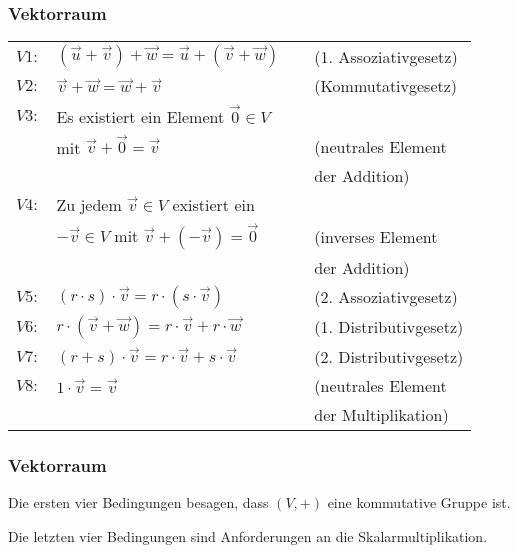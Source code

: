 \documentclass[hyperref={pdfpagelabels=false}]{beamer}
\theoremstyle{plain}%
\theoremstyle{definition}
\theoremstyle{remark}
\newcommand{\vektor}[1]{\overrightarrow{#1}}
\begin{document}
\begin{frame}
\frametitle{Vektorraum}

\begin{definition}
\begin{tabular} {l l c l}
$V1:$ & $\left(\vektor{u} + \vektor{v} \right) + \vektor{w} = 
\vektor{u} + \left(\vektor{v} + \vektor{w} \right)$ & $\,$ &
(1. Assoziativgesetz) \\
$V2:$ & $\vektor{v} + \vektor{w} = \vektor{w} + 
\vektor{v}$ & & (Kommutativgesetz) \\
$V3:$ & Es existiert ein Element $\vektor{0} \in V$ & & \\
& mit  $\vektor{v} + \vektor{0} = \vektor{v}$ & & (neutrales 
Element \\
& & & der Addition) \\
$V4:$ & Zu jedem $\vektor{v} \in V$ existiert ein  
& & \\
& $-\vektor{v} \in V$ mit $\vektor{v} + (- \vektor{v}) = \vektor{0}$ & &
(inverses Element \\
& & & der Addition) \\
$V5:$ & $(r \cdot s) \cdot \vektor{v} = r \cdot ( s \cdot \vektor{v})$ 
& & (2. Assoziativgesetz) \\
$V6:$ & $r \cdot (\vektor{v} + \vektor{w}) = r \cdot 
\vektor{v} + r \cdot \vektor{w}$ & & (1. Distributivgesetz) \\
$V7:$ & $(r + s) \cdot \vektor{v} = r \cdot \vektor{v} + 
s \cdot \vektor{v}$ & & (2. Distributivgesetz) \\
$V8:$ & $ 1 \cdot \vektor{v} = \vektor{v}$ & & (neutrales Element \\
& & & der Multiplikation)
\end{tabular}
\end{definition}

\end{frame}

\begin{frame}
\frametitle{Vektorraum}

Die ersten vier Bedingungen besagen, dass $(V,+)$ eine kommutative Gruppe ist. 

\bigbreak

\pause 
Die letzten vier Bedingungen sind Anforderungen an die Skalarmultiplikation. 

\end{frame}
\end{document}
